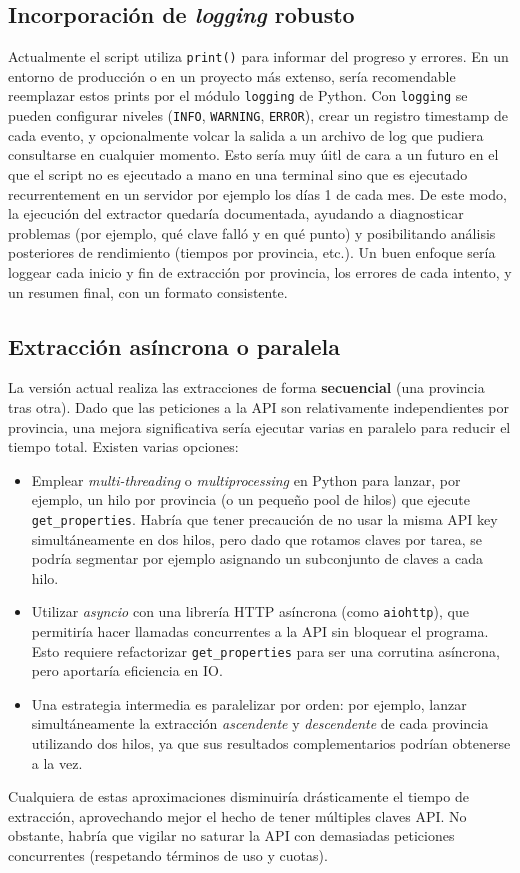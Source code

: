 \documentclass[a4paper,11pt]{book}
\begin{document}
\subsection*{Incorporación de \textit{logging} robusto}
Actualmente el script utiliza \texttt{print()} para informar del progreso y errores. En un entorno de producción o en un proyecto más extenso, sería recomendable reemplazar estos prints por el módulo \texttt{logging} de Python. Con \texttt{logging} se pueden configurar niveles (\texttt{INFO}, \texttt{WARNING}, \texttt{ERROR}), crear un registro timestamp de cada evento, y opcionalmente volcar la salida a un archivo de log que pudiera consultarse en cualquier momento. Esto sería muy úitl de cara a un futuro en el que el script no es ejecutado a mano en una terminal sino que es ejecutado recurrentement en un servidor por ejemplo los días 1 de cada mes. De este modo, la ejecución del extractor quedaría documentada, ayudando a diagnosticar problemas (por ejemplo, qué clave falló y en qué punto) y posibilitando análisis posteriores de rendimiento (tiempos por provincia, etc.). Un buen enfoque sería loggear cada inicio y fin de extracción por provincia, los errores de cada intento, y un resumen final, con un formato consistente.

\subsection*{Extracción asíncrona o paralela}
La versión actual realiza las extracciones de forma \textbf{secuencial} (una provincia tras otra). Dado que las peticiones a la API son relativamente independientes por provincia, una mejora significativa sería ejecutar varias en paralelo para reducir el tiempo total. Existen varias opciones:
\begin{itemize}
    \item Emplear \textit{multi-threading} o \textit{multiprocessing} en Python para lanzar, por ejemplo, un hilo por provincia (o un pequeño pool de hilos) que ejecute \texttt{get\_properties}. Habría que tener precaución de no usar la misma API key simultáneamente en dos hilos, pero dado que rotamos claves por tarea, se podría segmentar por ejemplo asignando un subconjunto de claves a cada hilo.
    \item Utilizar \textit{asyncio} con una librería HTTP asíncrona (como \texttt{aiohttp}), que permitiría hacer llamadas concurrentes a la API sin bloquear el programa. Esto requiere refactorizar \texttt{get\_properties} para ser una corrutina asíncrona, pero aportaría eficiencia en IO.
    \item Una estrategia intermedia es paralelizar por orden: por ejemplo, lanzar simultáneamente la extracción \textit{ascendente} y \textit{descendente} de cada provincia utilizando dos hilos, ya que sus resultados complementarios podrían obtenerse a la vez.
\end{itemize}
Cualquiera de estas aproximaciones disminuiría drásticamente el tiempo de extracción, aprovechando mejor el hecho de tener múltiples claves API. No obstante, habría que vigilar no saturar la API con demasiadas peticiones concurrentes (respetando términos de uso y cuotas).
\end{document}
